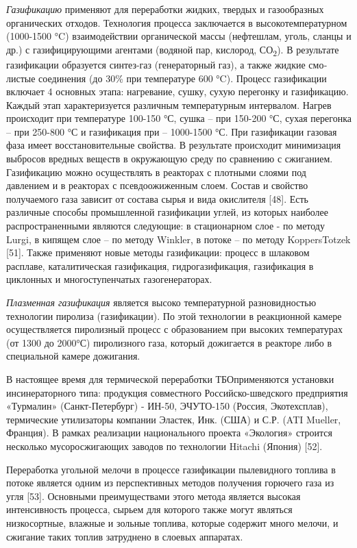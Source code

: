 \emph{Газификацию} применяют для переработки жидких, твердых и
газообразных органических отходов. Технология процесса заключается в
высокотемператур­ном (1000-1500 °C) взаимодействии органической массы
(нефтешлам, уголь, сланцы и др.) с газифицирующими агентами (водяной
пар, кислород, СО\textsubscript{2}). В результате газификации образуется
синтез-газ (генера­торный газ), а также жидкие смо­листые соединения (до
30\% при температуре 600 °C). Процесс газификации включает 4 основных
этапа: нагревание, сушку, сухую перегонку и газифика­цию. Каждый этап
характеризуется различным температурным интервалом. Нагрев происходит
при темпе­ратуре 100-150 °С, сушка -- при 150-200 °С, сухая пере­гонка --
при 250-800 °С и газификация при -- 1000-1500 °С. При газификации
газовая фаза имеет восстановительные свойства. В результате происходит
минимизация выбросов вредных веществ в окружающую среду по сравнению с
сжиганием. Газификацию можно осуществлять в реакторах с плотными слоями
под давлением и в реакторах с псев­доожиженным слоем. Состав и свойство
получаемого газа зависит от состава сырья и вида окислителя {[}48{]}.
Есть различные способы промышленной газификации углей, из которых
наиболее распространенными являются следующие: в стационарном слое - по
методу Lurgi, в кипящем слое -- по методу Winkler, в потоке -- по методу
KoppersTotzek {[}51{]}. Также применяют новые методы газификации:
процесс в шлаковом расплаве, каталитическая газификация,
гидрогазификация, газификация в циклонных и многоступенчатых
газогенераторах.

\emph{Плазменная газификация} является высоко температурной
разновидностью технологии пиролиза (газификации). По этой технологии в
реакционной камере осуществляется пиролизный процесс с образованием при
высоких температурах (от 1300 до 2000°С) пиролизного газа, который
дожигается в реакторе либо в специальной камере дожигания.

В настоящее время для термической переработки ТБОприменяются установки
инсинераторного типа: продукция совместного Российско-шведского
предприятия «Турмалин» (Санкт-Петербург) - ИН-50, ЭЧУТО-150 (Россия,
Экотехсплав), термические утилизаторы компании Эластек, Инк. (США) и
С.Р. (ATI Mueller, Франция). В рамках реализации национального проекта
«Экология» строится несколько мусоросжигающих заводов по технологии
Hitachi (Япония) {[}52{]}.

Переработка угольной мелочи в процессе газификации пылевидного топлива в
потоке является одним из перспективных методов получения горючего газа
из угля {[}53{]}. Основными преимуществами этого метода является высокая
интенсивность процесса, сырьем для которого также могут являться
низкосортные, влажные и зольные топлива, которые содержит много мелочи,
и сжигание таких топлив затруднено в слоевых аппаратах.


